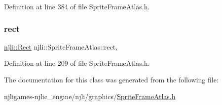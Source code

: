 Definition at line 384 of file Sprite\+Frame\+Atlas.\+h.

\mbox{\label{classnjli_1_1_sprite_frame_atlas_a85cbbab899666861a829c1cb06a03f87}} 
\subsubsection{\texorpdfstring{rect}{rect}}
{\footnotesize\ttfamily \mbox{\hyperlink{classnjli_1_1_rect}{njli\+::\+Rect}} njli\+::\+Sprite\+Frame\+Atlas\+::rect\hspace{0.3cm}{\ttfamily [static]}, {\ttfamily [protected]}}



Definition at line 209 of file Sprite\+Frame\+Atlas.\+h.



The documentation for this class was generated from the following file\+:\begin{DoxyCompactItemize}
\item 
njligames-\/njlic\+\_\+engine/njli/graphics/\mbox{\hyperlink{_sprite_frame_atlas_8h}{Sprite\+Frame\+Atlas.\+h}}\end{DoxyCompactItemize}
